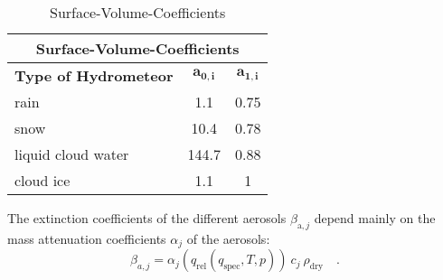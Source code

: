 \begin{table}[]
    \centering
    \begin{tabular}{|l|c|c|}
    \hline
    \multicolumn{3}{|c|}{\textbf{Surface-Volume-Coefficients}}\\
    \hline
    \textbf{Type of Hydrometeor} & $\boldsymbol{a_{0,i}}$ & $\boldsymbol{a_{1,i}}$\\
    \hline
        rain & 1.1&0.75 \\
    \hline
        snow& 10.4& 0.78\\
    \hline
        liquid cloud water&144.7 & 0.88\\
    \hline
        cloud ice & 1.1& 1\\
    \hline
    \end{tabular}
    \caption{Surface-Volume-Coefficients}
    \label{tab:Surface-Volume-Coefficients}
\end{table}
The extinction coefficients of the different aerosols $\beta_{\mathrm{a},j}$ depend mainly on the mass attenuation coefficients $\alpha_{j}$ of the aerosols:
\begin{equation}
    \beta_{a,j} = \alpha_{j} (q_{\mathrm{rel}}(q_{\mathrm{spec}}, T ,p))  \ c_{j} \  \rho_{\mathrm{dry}} \quad .
\end{equation}

